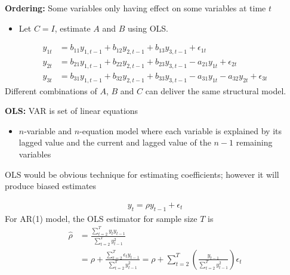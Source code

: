 \documentclass{beamer}
\begin{document}
\begin{frame}
  \textbf{Ordering:} Some variables only having effect on some variables at time $t$
  \begin{itemize}
    \item Let $C=I$, estimate $A$ and $B$ using OLS.
  \end{itemize}
   
\begin{align}
  y_{1t} &= b_{11}y_{1,t-1} + b_{12}y_{2,t-1} + b_{13}y_{3,t-1} + \epsilon_{1t}\\ \nonumber
  y_{2t} &= b_{21}y_{1,t-1} + b_{22}y_{2,t-1} + b_{23}y_{3,t-1}-a_{21}y_{1t} + \epsilon_{2t}\\ \nonumber
  y_{3t} &= b_{31}y_{1,t-1} + b_{32}y_{2,t-1} + b_{33}y_{3,t-1}-a_{31}y_{1t} - a_{32}y_{2t} + \epsilon_{3t}
\end{align}
  \medskip 
  Different combinations of $A$, $B$ and $C$ can deliver the same structural model. 
\end{frame}

\begin{frame}
  \textbf{OLS:} VAR is set of linear equations
  \begin{itemize}
    \item $n$-variable and $n$-equation model where each variable is explained by its lagged value and the current and lagged value of the $n-1$ remaining variables
  \end{itemize}
  \medskip
  OLS would be obvious technique for estimating coefficients; however it will produce biased estimates
\end{frame}

\begin{frame}  
\begin{align}
  y_t= \rho y_{t-1} + \epsilon_t
\end{align}
 For AR(1) model, the OLS estimator for sample size $T$ is
\begin{align}
  \hat{\rho} &= \frac{\sum^T_{t=2}y_t y_{t-1}}{\sum^T_{t=2}y^2_{t-1}}\\ \nonumber
  &= \rho + \frac{\sum^T_{t=2}\epsilon_t y_{t-1}}{\sum^T_{t=2}y^2_{t-1}}=
  \rho + \sum_{t=2}^T \left(\frac{y_{t-1}}{\sum_{t=2}^T y^2_{t-1}} \right) \epsilon_t
\end{align}
\medskip

\end{frame}
\end{document}
